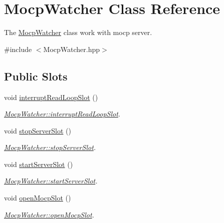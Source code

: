 \hypertarget{class_mocp_watcher}{\section{\-Mocp\-Watcher \-Class \-Reference}
\label{class_mocp_watcher}
}


\-The \hyperlink{class_mocp_watcher}{\-Mocp\-Watcher} class work with mocp server.  




{\ttfamily \#include $<$\-Mocp\-Watcher.\-hpp$>$}

\subsection*{\-Public \-Slots}
\begin{DoxyCompactItemize}
\item 
void \hyperlink{class_mocp_watcher_a9e2dde0e726fdb6a8da673434c05b274}{interrupt\-Read\-Loop\-Slot} ()
\begin{DoxyCompactList}\small\item\em \hyperlink{class_mocp_watcher_a9e2dde0e726fdb6a8da673434c05b274}{\-Mocp\-Watcher\-::interrupt\-Read\-Loop\-Slot}. \end{DoxyCompactList}\item 
void \hyperlink{class_mocp_watcher_ab345d37dbf4b3e8e5582e7a85a88573d}{stop\-Server\-Slot} ()
\begin{DoxyCompactList}\small\item\em \hyperlink{class_mocp_watcher_ab345d37dbf4b3e8e5582e7a85a88573d}{\-Mocp\-Watcher\-::stop\-Server\-Slot}. \end{DoxyCompactList}\item 
void \hyperlink{class_mocp_watcher_a7ad70ec714f839fcd74b37774bb17020}{start\-Server\-Slot} ()
\begin{DoxyCompactList}\small\item\em \hyperlink{class_mocp_watcher_a7ad70ec714f839fcd74b37774bb17020}{\-Mocp\-Watcher\-::start\-Server\-Slot}. \end{DoxyCompactList}\item 
void \hyperlink{class_mocp_watcher_a4779c8ac265c14f31f0f54932fe74012}{open\-Mocp\-Slot} ()
\begin{DoxyCompactList}\small\item\em \hyperlink{class_mocp_watcher_a4779c8ac265c14f31f0f54932fe74012}{\-Mocp\-Watcher\-::open\-Mocp\-Slot}. \end{DoxyCompactList}\end{DoxyCompactItemize}
